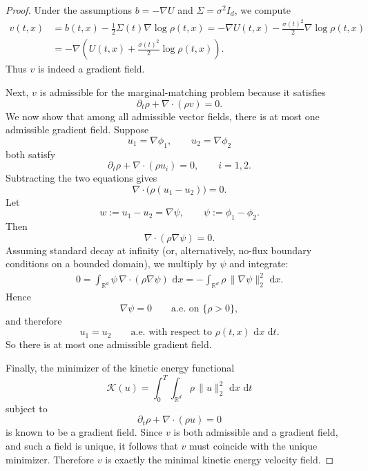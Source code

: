 \documentclass[10pt,a4paper]{amsart}
\begin{document}
\begin{proof}
Under the assumptions \(b=-\nabla U\) and \(\Sigma=\sigma^2 I_d\), we compute
\begin{align*}
    v(t,x)
    &= b(t,x) - \frac12 \Sigma(t)\nabla \log \rho(t,x) = -\nabla U(t,x) - \frac{\sigma(t)^2}{2}\nabla \log \rho(t,x) \\
    &= -\nabla\!\left(U(t,x) + \frac{\sigma(t)^2}{2}\log \rho(t,x)\right).
\end{align*}
Thus \(v\) is indeed a gradient field.

Next, \(v\) is admissible for the marginal-matching problem because it satisfies
\begin{equation*}
    \partial_t \rho + \nabla\cdot(\rho v)=0.
\end{equation*}
We now show that among all admissible vector fields, there is at most one admissible gradient field. Suppose
\[
u_1 = \nabla \phi_1,
\qquad
u_2 = \nabla \phi_2
\]
both satisfy
\begin{equation*}
    \partial_t \rho + \nabla\cdot(\rho u_i)=0,
    \qquad i=1,2.
\end{equation*}
Subtracting the two equations gives
\begin{equation*}
    \nabla\cdot\bigl(\rho (u_1-u_2)\bigr)=0.
\end{equation*}
Let
\[
w := u_1-u_2 = \nabla \psi,
\qquad
\psi := \phi_1-\phi_2.
\]
Then
\begin{equation*}
    \nabla\cdot(\rho \nabla \psi)=0.
\end{equation*}
Assuming standard decay at infinity (or, alternatively, no-flux boundary conditions on a bounded domain), we multiply by \(\psi\) and integrate:
\begin{align*}
    0
    = \int_{\mathbb{R}^d} \psi \,\nabla\cdot(\rho \nabla \psi)\,\,\mathrm{d} x
    = - \int_{\mathbb{R}^d} \rho\, \lVert \nabla \psi \rVert_2^2 \,\,\mathrm{d} x.
\end{align*}
Hence
\[
\nabla \psi = 0
\qquad \text{a.e. on } \{\rho>0\},
\]
and therefore
\[
u_1=u_2
\qquad \text{a.e. with respect to } \rho(t,x)\,\,\mathrm{d} x\,\,\mathrm{d} t.
\]
So there is at most one admissible gradient field.

Finally, the minimizer of the kinetic energy functional
\[
\mathcal{K}(u)=\int_0^T \int_{\mathbb{R}^d} \rho\, \|u\|^2_2 \,\,\mathrm{d} x\,\,\mathrm{d} t
\]
subject to
\[
\partial_t\rho+\nabla\cdot(\rho u)=0
\]
is known to be a gradient field. Since \(v\) is both admissible and a gradient field, and such a field is unique, it follows that \(v\) must coincide with the unique minimizer. Therefore \(v\) is exactly the minimal kinetic energy velocity field.
\end{proof}
\end{document}

